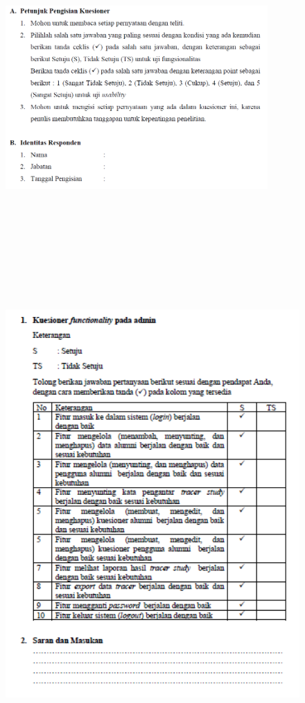 \begin{figure}[H]
	\centering
	\includegraphics[width=10cm,height=12cm]{gambar/UAT/surat kuesioner 2}
	\label{surat_kuesioner2}
\end{figure}

\begin{figure}[H]
	\centering
	\includegraphics[width=15cm,height=18cm]{gambar/UAT/kf_admin}
	\label{kf_admin}
\end{figure}

